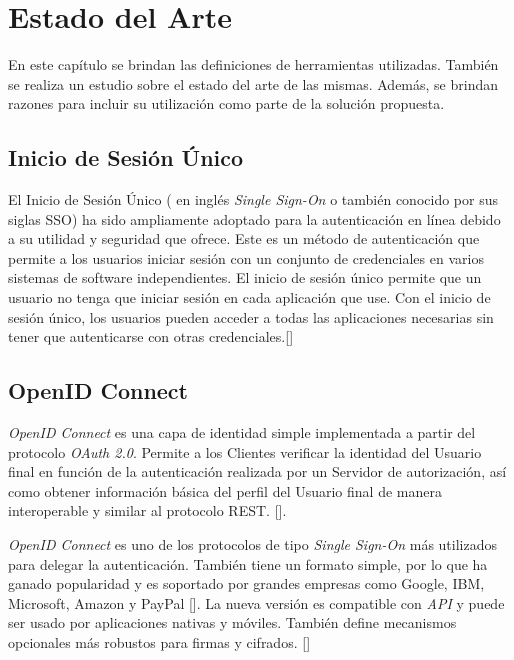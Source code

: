 \chapter{Estado del Arte}\label{chapter:state-of-the-art}
En este capítulo se brindan las definiciones de herramientas utilizadas. También se realiza un estudio sobre el estado del arte de las mismas. Además, se brindan razones para incluir su utilización como parte de la solución propuesta.


\section{Inicio de Sesión Único}
El Inicio de Sesión Único ( en inglés \textit{Single Sign-On} o también conocido por sus siglas SSO) ha sido ampliamente adoptado para la autenticación en línea debido a su utilidad y seguridad que ofrece. Este es un método de autenticación que permite a los usuarios iniciar sesión con un conjunto de credenciales en varios sistemas de software independientes. El inicio de sesión único permite que un usuario no tenga que iniciar sesión en cada aplicación que use. Con el inicio de sesión único, los usuarios pueden acceder a todas las aplicaciones necesarias sin tener que autenticarse con otras credenciales.[\cite{microsoft-doc}]

\section{OpenID Connect}
\textit{OpenID Connect} es una capa de identidad simple implementada a partir del protocolo \textit{OAuth 2.0}. Permite a los Clientes verificar la identidad del Usuario final en función de la autenticación realizada por un Servidor de autorización, así como obtener información básica del perfil del Usuario final de manera interoperable y similar al protocolo REST. [\cite{openid-doc}]. 

\textit{OpenID Connect }es uno de los protocolos de tipo \textit{Single Sign-On} más utilizados para delegar la autenticación. También tiene un formato simple, por lo que ha ganado popularidad y es soportado por grandes empresas como Google, IBM, Microsoft, Amazon y PayPal [\cite{mainka2017sok}]. La nueva versión es compatible con \textit{API} y puede ser usado por aplicaciones nativas y móviles. También define mecanismos opcionales más robustos para firmas y cifrados. [\cite{openid-doc}]

